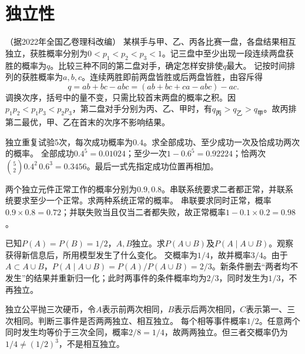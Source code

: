 \par\addvspace{12pt}

\section{独立性}

（据2022年全国乙卷理科改编）
某棋手与甲、乙、丙各比赛一盘，各盘结果相互独立，获胜概率分别为\(0<p_1<p_2<p_3<1\)。记三盘中至少出现一段连续两盘获胜的概率为\(q\)。比较三种不同的第二盘对手，确定怎样安排使\(q\)最大。
\solutionanswer
记按时间排列的获胜概率为\(a,b,c\)。连续两胜即前两盘皆胜或后两盘皆胜，由容斥得
\[
 q=ab+bc-abc=(ab+bc+ca-abc)-ac.
\]
调换次序，括号中的量不变，只需比较首末两盘的概率之积。因\(p_1p_2<p_1p_3<p_2p_3\)，第二盘对手分别为丙、乙、甲时，有\(q_{\text{丙}}>q_{\text{乙}}>q_{\text{甲}}\)。故丙排第二最优，甲、乙在首末的次序不影响结果。


独立重复试验5次，每次成功概率为\(0.4\)。求全部成功、至少成功一次及恰成功两次的概率。
\solutionanswer
全部成功\(0.4^5=0.01024\)；至少一次\(1-0.6^5=0.92224\)；恰两次\(\binom520.4^2\,0.6^3=0.3456\)。最后一式先指定成功位置再相加。


两个独立元件正常工作的概率分别为\(0.9,0.8\)。串联系统要求二者都正常，并联系统要求至少一个正常。求两种系统正常的概率。
\solutionanswer
串联要求同时正常，概率\(0.9\times0.8=0.72\)；并联失败当且仅当二者都失败，故正常概率\(1-0.1\times0.2=0.98\)。


已知\(P(A)=P(B)=1/2\)，\(A,B\)独立。求\(P(A\cup B)\)及\(P(A\mid A\cup B)\)。观察获得新信息后，所用模型发生了什么变化。
\solutionanswer
交概率为\(1/4\)，故并概率\(3/4\)。由于\(A\subset A\cup B\)，\(P(A\mid A\cup B)=P(A)/P(A\cup B)=2/3\)。新条件删去“两者均不发生”的结果并重新归一化；此时两事件的条件概率均为\(2/3\)，同时发生为\(1/3\)，不再独立。


独立公平抛三次硬币，令\(A\)表示前两次相同，\(B\)表示后两次相同，\(C\)表示第一、三次相同。判断三事件是否两两独立、相互独立。
\solutionanswer
每个相等事件概率\(1/2\)。任意两个同时发生均等价于三次全同，概率\(2/8=1/4\)，故两两独立。但三者交概率仍为\(1/4\ne(1/2)^3\)，不是相互独立。


